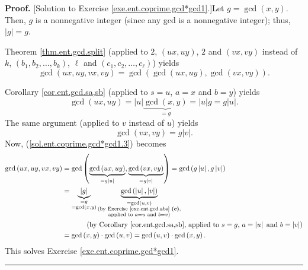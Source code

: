 \documentclass[numbers=enddot,12pt,final,onecolumn,notitlepage]{scrartcl}%
\numberwithin{exer}{subsection}
\theoremstyle{definition}
\newenvironment{fineprint}{\begin{small}}{\end{small}}
\newenvironment{proof}[1][Proof]{\noindent\textbf{#1.} }{\ \rule{0.5em}{0.5em}}
\begin{document}
\begin{fineprint}
\begin{proof}
[Solution to Exercise \ref{exe.ent.coprime.gcd*gcd1}.]Let $g=\gcd\left(
x,y\right)  $. Then, $g$ is a nonnegative integer (since any gcd is a
nonnegative integer); thus, $\left\vert g\right\vert =g$.

Theorem \ref{thm.ent.gcd.split} (applied to $2$, $\left(  ux,uy\right)  $, $2$
and $\left(  vx,vy\right)  $ instead of $k$, $\left(  b_{1},b_{2},\ldots
,b_{k}\right)  $, $\ell$ and $\left(  c_{1},c_{2},\ldots,c_{\ell}\right)  $)
yields
\begin{equation}
\gcd\left(  ux,uy,vx,vy\right)  =\gcd\left(  \gcd\left(  ux,uy\right)
,\gcd\left(  vx,vy\right)  \right)  . \label{sol.ent.coprime.gcd*gcd1.3}%
\end{equation}


Corollary \ref{cor.ent.gcd.sa,sb} (applied to $s=u$, $a=x$ and $b=y$) yields%
\[
\gcd\left(  ux,uy\right)  =\left\vert u\right\vert \underbrace{\gcd\left(
x,y\right)  }_{=g}=\left\vert u\right\vert g=g\left\vert u\right\vert .
\]
The same argument (applied to $v$ instead of $u$) yields%
\[
\gcd\left(  vx,vy\right)  =g\left\vert v\right\vert .
\]
Now, (\ref{sol.ent.coprime.gcd*gcd1.3}) becomes%
\begin{align*}
\gcd\left(  ux,uy,vx,vy\right)   &  =\gcd\left(  \underbrace{\gcd\left(
ux,uy\right)  }_{=g\left\vert u\right\vert },\underbrace{\gcd\left(
vx,vy\right)  }_{=g\left\vert v\right\vert }\right)  =\gcd\left(  g\left\vert
u\right\vert ,g\left\vert v\right\vert \right) \\
&  =\underbrace{\left\vert g\right\vert }_{\substack{=g\\=\gcd\left(
x,y\right)  }}\underbrace{\gcd\left(  \left\vert u\right\vert ,\left\vert
v\right\vert \right)  }_{\substack{=\gcd\left(  u,v\right)  \\\text{(by
Exercise \ref{exe.ent.gcd.abs} \textbf{(c)},}\\\text{applied to }a=u\text{ and
}b=v\text{)}}}\\
&  \ \ \ \ \ \ \ \ \ \ \left(  \text{by Corollary \ref{cor.ent.gcd.sa,sb},
applied to }s=g\text{, }a=\left\vert u\right\vert \text{ and }b=\left\vert
v\right\vert \right) \\
&  =\gcd\left(  x,y\right)  \cdot\gcd\left(  u,v\right)  =\gcd\left(
u,v\right)  \cdot\gcd\left(  x,y\right)  .
\end{align*}
This solves Exercise \ref{exe.ent.coprime.gcd*gcd1}.
\end{proof}
\end{fineprint}
\end{document}
